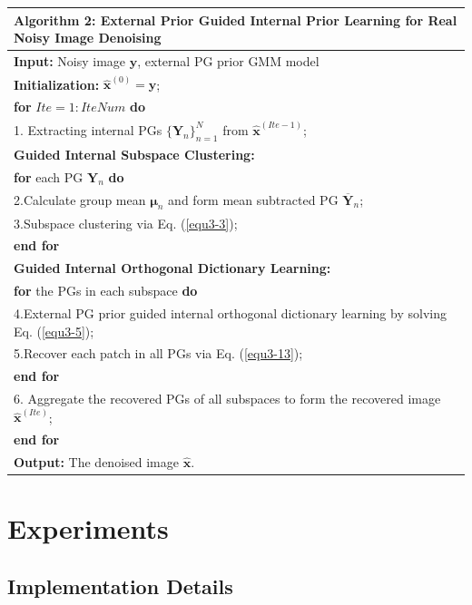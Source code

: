 \begin{table}[t!]
\label{alg3-2}
\begin{tabular}{l}
\hline
\textbf{Algorithm 2}: External Prior Guided Internal Prior Learning for Real Noisy Image Denoising
\\
\hline
\textbf{Input:} Noisy image $\mathbf{y}$, external PG prior GMM model
\\
\textbf{Initialization:} $\hat{\mathbf{x}}^{(0)}=\mathbf{y}$;
\\
\textbf{for} $Ite = 1:IteNum$ \textbf{do}
\\
1. Extracting internal PGs $\{\bm{Y}_{n}\}_{n=1}^{N}$ from $\hat{\mathbf{x}}^{(Ite-1)}$;
\\
\textbf{Guided Internal Subspace Clustering:}
\\
\quad\textbf{for} each PG $\bm{Y}_{n}$ \textbf{do}
\\
2.\quad Calculate group mean $\bm{\mu}_{n}$ and form mean subtracted PG $\bm{\overline{Y}}_{n}$;
\\
3.\quad Subspace clustering via Eq. (\ref{equ3-3});
\\
\quad\textbf{end for}
\\
\textbf{Guided Internal Orthogonal Dictionary Learning:}
\\
\quad\textbf{for} the PGs in each subspace \textbf{do}
\\
4.\quad External PG prior guided internal orthogonal dictionary learning by solving Eq. (\ref{equ3-5});
\\
5.\quad Recover each patch in all PGs via Eq. (\ref{equ3-13});
\\
\quad\textbf{end for}
\\
6. Aggregate the recovered PGs of all subspaces to form the recovered image $\hat{\mathbf{x}}^{(Ite)}$;
\\
\textbf{end for}
\\
\textbf{Output:} The denoised image $\hat{\mathbf{x}}$.
\\
\hline
\end{tabular}
\end{table}

\section{Experiments}

\subsection{Implementation Details}


